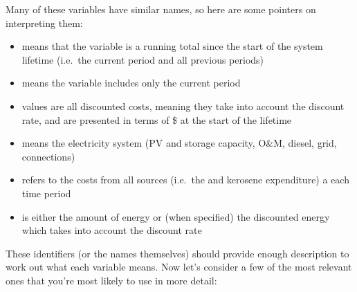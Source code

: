 \documentclass[letterpaper,10pt,english]{sphinxmanual}
\begin{document}
\sphinxAtStartPar
Many of these variables have similar names, so here are some pointers on
interpreting them:
\begin{itemize}
\item {} 
\sphinxAtStartPar
{} means that the variable is a running total since the
start of the system lifetime (i.e. the current period and all
previous periods)

\item {} 
\sphinxAtStartPar
{} means the variable includes only the current period

\item {} 
\sphinxAtStartPar
{} values are all discounted costs, meaning they take into account the discount rate, and are presented in terms of \$ at the start of the lifetime

\item {} 
\sphinxAtStartPar
{} means the electricity system (PV and storage capacity, O\&M,
diesel, grid, connections)

\item {} 
\sphinxAtStartPar
{} refers to the costs from all sources (i.e. the  and
kerosene expenditure) a each time period

\item {} 
\sphinxAtStartPar
{} is either the amount of energy or (when specified) the
discounted energy which takes into account the discount rate

\end{itemize}

\sphinxAtStartPar
These identifiers (or the names themselves) should provide enough
description to work out what each variable means. Now let’s consider a
few of the most relevant ones that you’re most likely to use in more
detail:
\end{document}

